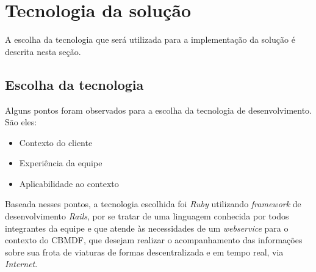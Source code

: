\chapter[Tecnologia da solução]{Tecnologia da solução}

  A escolha da tecnologia que será utilizada para a implementação da solução é descrita nesta seção.
  
  \section{Escolha da tecnologia}
  
    Alguns pontos foram observados para a escolha da tecnologia de desenvolvimento. São eles:
    
    \begin{itemize}
     \item Contexto do cliente
     \item Experiência da equipe
     \item Aplicabilidade ao contexto
    \end{itemize}
    
    Baseada nesses pontos, a tecnologia escolhida foi \textit{Ruby} utilizando \textit{framework} de desenvolvimento \textit{Rails},
    por se tratar de uma linguagem conhecida por todos integrantes da equipe e que atende às necessidades 
    de um \textit{webservice} para o contexto do CBMDF, que desejam realizar o acompanhamento das informações sobre sua 
    frota de viaturas de formas descentralizada e em tempo real, via \textit{Internet}.

